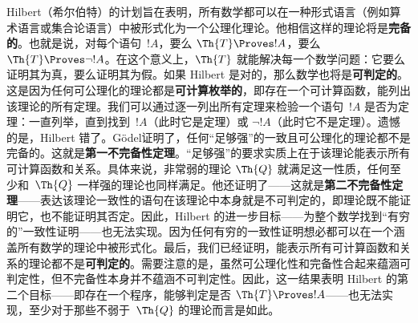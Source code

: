 Hilbert（希尔伯特）的计划旨在表明，所有数学都可以在一种形式语言（例如算术语言或集合论语言）中被形式化为一个公理化理论。他相信这样的理论将是\textbf{完备的}。也就是说，对每个语句~$!A$，要么 $\Th{T} \Proves !A$，要么 $\Th{T} \Proves \lnot !A$。在这个意义上，$\Th{T}$ 就能解决每一个数学问题：它要么证明其为真，要么证明其为假。如果 Hilbert 是对的，那么数学也将是\textbf{可判定的}。这是因为任何可公理化的理论都是\textbf{可计算枚举的}，即存在一个可计算函数，能列出该理论的所有定理。我们可以通过逐一列出所有定理来检验一个语句~$!A$ 是否为定理：一直列举，直到找到~$!A$（此时它是定理）或 $\lnot !A$（此时它不是定理）。遗憾的是，Hilbert 错了。Gödel证明了，任何“足够强”的一致且可公理化的理论都不是完备的。这就是\textbf{第一不完备性定理}。“足够强”的要求实质上在于该理论能表示所有可计算函数和关系。具体来说，非常弱的理论 $\Th{Q}$ 就满足这一性质，任何至少和~$\Th{Q}$ 一样强的理论也同样满足。他还证明了——这就是\textbf{第二不完备性定理}——表达该理论一致性的语句在该理论中本身就是不可判定的，即理论既不能证明它，也不能证明其否定。因此，Hilbert 的进一步目标——为整个数学找到“有穷的”一致性证明——也无法实现。因为任何有穷的一致性证明想必都可以在一个涵盖所有数学的理论中被形式化。最后，我们已经证明，能表示所有可计算函数和关系的理论都不是\textbf{可判定的}。需要注意的是，虽然可公理化性和完备性合起来蕴涵可判定性，但不完备性本身并不蕴涵不可判定性。因此，这一结果表明 Hilbert 的第二个目标——即存在一个程序，能够判定是否 $\Th{T} \Proves !A$——也无法实现，至少对于那些不弱于~$\Th{Q}$ 的理论而言是如此。